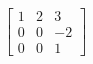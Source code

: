 \documentclass[preview]{standalone}
\begin{document}
\begin{align*}
\begin{bmatrix} 1 & 2 & 3 \\ 0 & 0 & -2 \\ 0 & 0 & 1 \end{bmatrix}
\end{align*}
\end{document}
